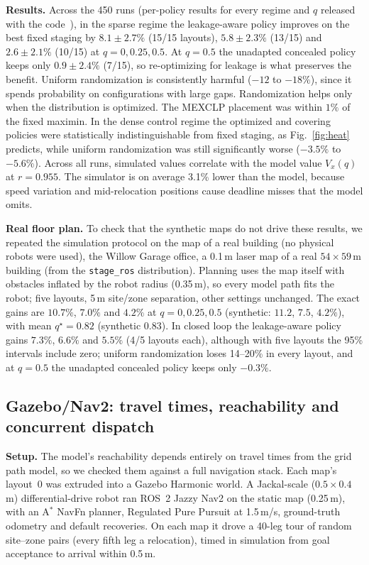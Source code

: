 \documentclass[letterpaper,journal]{IEEEtran}
\theoremstyle{remark}
\begin{document}
\textbf{Results.} Across the 450 runs (per-policy results for every regime and $q$ released with the code~\cite{alam2026code}), in the sparse regime the leakage-aware policy improves on the best fixed staging by $8.1\pm2.7\%$ (15/15 layouts), $5.8\pm2.3\%$ (13/15) and $2.6\pm2.1\%$ (10/15) at $q=0,0.25,0.5$. At $q=0.5$ the unadapted concealed policy keeps only $0.9\pm2.4\%$ (7/15), so re-optimizing for leakage is what preserves the benefit. Uniform randomization is consistently harmful ($-12$ to $-18\%$), since it spends probability on configurations with large gaps. Randomization helps only when the distribution is optimized. The MEXCLP placement was within $1\%$ of the fixed maximin. In the dense control regime the optimized and covering policies were statistically indistinguishable from fixed staging, as Fig.~\ref{fig:heat} predicts, while uniform randomization was still significantly worse ($-3.5\%$ to $-5.6\%$). Across all runs, simulated values correlate with the model value $V_x(q)$ at $r=0.955$. The simulator is on average 3.1\% lower than the model, because speed variation and mid-relocation positions cause deadline misses that the model omits.

\textbf{Real floor plan.} To check that the synthetic maps do not drive these results, we repeated the simulation protocol on the map of a real building (no physical robots were used), the Willow Garage office, a 0.1\,m laser map of a real $54\times59$\,m building (from the \texttt{stage\_ros} distribution). Planning uses the map itself with obstacles inflated by the robot radius (0.35\,m), so every model path fits the robot; five layouts, 5\,m site/zone separation, other settings unchanged. The exact gains are $10.7\%$, $7.0\%$ and $4.2\%$ at $q=0,0.25,0.5$ (synthetic: $11.2$, $7.5$, $4.2\%$), with mean $q^\star=0.82$ (synthetic $0.83$). In closed loop the leakage-aware policy gains $7.3\%$, $6.6\%$ and $5.5\%$ (4/5 layouts each), although with five layouts the 95\% intervals include zero; uniform randomization loses 14--20\% in every layout, and at $q=0.5$ the unadapted concealed policy keeps only $-0.3\%$.

\subsection{Gazebo/Nav2: travel times, reachability and concurrent dispatch}
\textbf{Setup.} The model's reachability depends entirely on travel times from the grid path model, so we checked them against a full navigation stack. Each map's layout~0 was extruded into a Gazebo Harmonic world. A Jackal-scale ($0.5\times0.4$\,m) differential-drive robot ran ROS~2 Jazzy Nav2 on the static map (0.25\,m), with an A$^\ast$ NavFn planner, Regulated Pure Pursuit at 1.5\,m/s, ground-truth odometry and default recoveries. On each map it drove a 40-leg tour of random site--zone pairs (every fifth leg a relocation), timed in simulation from goal acceptance to arrival within 0.5\,m.
\end{document}
